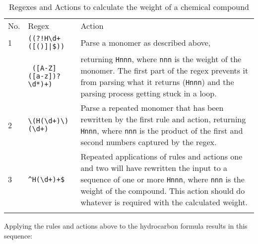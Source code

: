 \begin{table}[ht]
    \caption{Regexes and Actions to calculate the weight of a chemical
    compound}
    \empty{}\label{Regexes and Actions to calculate the weight of a
    chemical compound}
    \begin{tabular}{lp{\regexwidth}p{\actionwidth}}

        \tabletopline{}%
        No.   & Regex                       & Action \\
        \tablemiddleline{}%
        1     & \verb'((?!H\d+([()]|$))'    & Parse a monomer as described above,  \\
              & \verb' ([A-Z]([a-z])?\d*)+)'& returning \verb!Hnnn!, where \verb!nnn! is
                                              the weight of the monomer.  The first part
                                              of the regex prevents it from parsing what
                                              it returns (\verb!Hnnn!) and the parsing
                                              process getting stuck in a loop.  \\
        2     & \verb!\(H(\d+)\)(\d+)!      & Parse a repeated monomer that has been
                                              rewritten by the first rule and action,
                                              returning \verb!Hnnn!, where \verb!nnn! is
                                              the product of the first and second numbers
                                              captured by the regex.  \\
        3     & \verb!^H(\d+)+$!            & Repeated applications of rules and
                                              actions one and two will have rewritten the
                                              input to a sequence of one or more
                                              \verb!Hnnn!, where \verb!nnn! is the weight
                                              of the compound.  This action should do
                                              whatever is required with the calculated
                                              weight.  \\
        \tablebottomline{}%

    \end{tabular}
\end{table}

Applying the rules and actions above to the hydrocarbon formula results in
this sequence:

